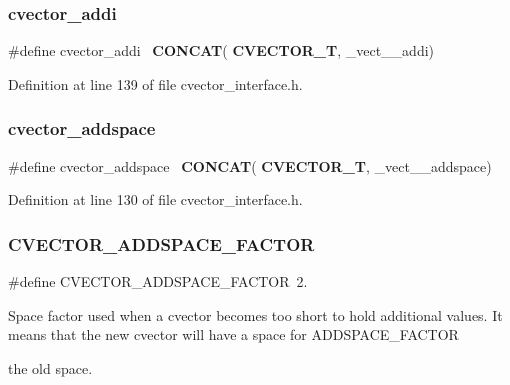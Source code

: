 \subsubsection{cvector\+\_\+addi}
{\footnotesize\ttfamily \#define cvector\+\_\+addi~\textbf{ C\+O\+N\+C\+AT}(\textbf{ C\+V\+E\+C\+T\+O\+R\+\_\+T}, \+\_\+vect\+\_\+\+\_\+addi)}



Definition at line 139 of file cvector\+\_\+interface.\+h.

\mbox{\label{cvector__interface_8h_a4205916435bbfc3842cfd75a43e771ed}} 
\subsubsection{cvector\+\_\+addspace}
{\footnotesize\ttfamily \#define cvector\+\_\+addspace~\textbf{ C\+O\+N\+C\+AT}(\textbf{ C\+V\+E\+C\+T\+O\+R\+\_\+T}, \+\_\+vect\+\_\+\+\_\+addspace)}



Definition at line 130 of file cvector\+\_\+interface.\+h.

\mbox{\label{cvector__interface_8h_a3507de422c2c055efe1ddaa2e47c2a40}} 
\subsubsection{C\+V\+E\+C\+T\+O\+R\+\_\+\+A\+D\+D\+S\+P\+A\+C\+E\+\_\+\+F\+A\+C\+T\+OR}
{\footnotesize\ttfamily \#define C\+V\+E\+C\+T\+O\+R\+\_\+\+A\+D\+D\+S\+P\+A\+C\+E\+\_\+\+F\+A\+C\+T\+OR~2.}

Space factor used when a cvector becomes too short to hold additional values. It means that the new cvector will have a space for A\+D\+D\+S\+P\+A\+C\+E\+\_\+\+F\+A\+C\+T\+OR
\begin{DoxyItemize}
\item the old space. 
\end{DoxyItemize}

